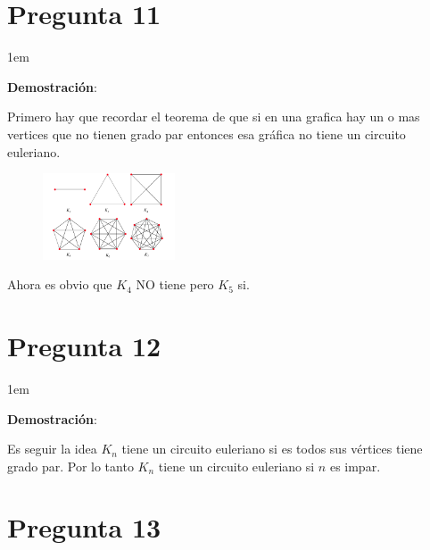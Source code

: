 \documentclass[12pt, fleqn]{article}                            %
\newenvironment{SmallIndentation}[1][0.75em]                    %
        {\begin{adjustwidth}{#1}{}\begin{footnotesize}}             %
        {\end{footnotesize}\end{adjustwidth}}                       %
\theoremstyle{break}                                            %
\begin{document}
    \section{Pregunta 11}

        \begin{SmallIndentation}[1em]
            \textbf{Demostración}:
        
            Primero hay que recordar el teorema de que si en una grafica hay un o mas vertices que no tienen
            grado par entonces esa gráfica no tiene un circuito euleriano.

            \begin{figure}[h]
                \centering
                \includegraphics[width=0.35\textwidth]{SomeK}
            \end{figure}

            Ahora es obvio que $K_4$ NO tiene pero $K_5$ si.
        \end{SmallIndentation}


    \section{Pregunta 12}

        \begin{SmallIndentation}[1em]
            \textbf{Demostración}:
        
            Es seguir la idea $K_n$ tiene un circuito euleriano si es todos sus vértices tiene grado par.
            Por lo tanto $K_n$ tiene un circuito euleriano si $n$ es impar.

        \end{SmallIndentation}


    \section{Pregunta 13}
\end{document}
